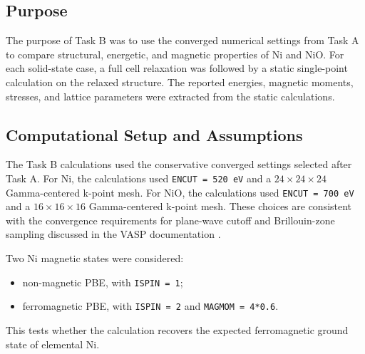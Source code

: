 \subsection{Purpose}

The purpose of Task B was to use the converged numerical settings from Task A
to compare structural, energetic, and magnetic properties of Ni and NiO.  For
each solid-state case, a full cell relaxation was followed by a static
single-point calculation on the relaxed structure.  The reported energies,
magnetic moments, stresses, and lattice parameters were extracted from the
static calculations.

\subsection{Computational Setup and Assumptions}

The Task B calculations used the conservative converged settings selected after
Task A.  For Ni, the calculations used \texttt{ENCUT = 520 eV} and a
\(24\times24\times24\) Gamma-centered k-point mesh.  For NiO, the calculations
used \texttt{ENCUT = 700 eV} and a \(16\times16\times16\) Gamma-centered
k-point mesh.  These choices are consistent with the convergence requirements
for plane-wave cutoff and Brillouin-zone sampling discussed in the VASP
documentation \cite{vasp-encut,vasp-kpoints}.

Two Ni magnetic states were considered:
\begin{itemize}
  \item non-magnetic PBE, with \texttt{ISPIN = 1};
  \item ferromagnetic PBE, with \texttt{ISPIN = 2} and
  \texttt{MAGMOM = 4*0.6}.
\end{itemize}
This tests whether the calculation recovers the expected ferromagnetic ground
state of elemental Ni.

